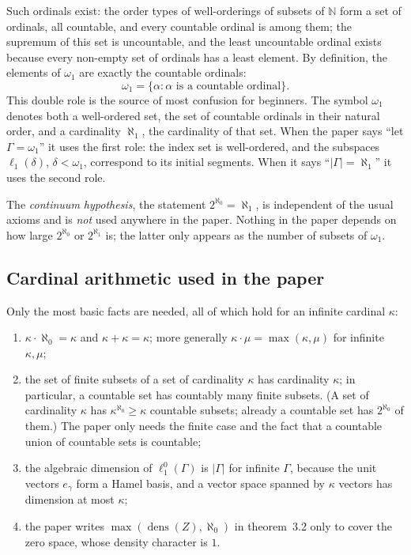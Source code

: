 \documentclass[12pt]{article}
\theoremstyle{definition}
\theoremstyle{remark}
\newcommand{\lo}[1]{\ell_1^0(#1)}
\newcommand{\ellone}[1]{\ell_1(#1)}
\newcommand{\NN}{\mathbb{N}}
\begin{document}
Such ordinals exist: the order types of well-orderings of subsets of $\NN$
form a set of ordinals, all countable, and every countable ordinal is among
them; the supremum of this set is uncountable, and the least
uncountable ordinal exists because every non-empty set of ordinals has a least element.
By definition, the elements of $\omega_1$ are exactly the countable ordinals:
\[
\omega_1=\{\alpha:\alpha\text{ is a countable ordinal}\}.
\]
This double role is the source of most confusion for beginners. The symbol
$\omega_1$ denotes both a well-ordered set, the set of countable ordinals in
their natural order, and a cardinality $\aleph_1$, the cardinality of that
set. When the paper says ``let $\Gamma=\omega_1$'' it uses the first role: the
index set is well-ordered, and the subspaces $\ellone{\delta}$,
$\delta<\omega_1$, correspond to its initial segments. When it says
``$|\Gamma|=\aleph_1$'' it uses the second role.

The \emph{continuum hypothesis}, the statement $2^{\aleph_0}=\aleph_1$, is
independent of the usual axioms and is \emph{not} used anywhere in the paper.
Nothing in the paper depends on how large $2^{\aleph_0}$ or $2^{\aleph_1}$
is; the latter only appears as the number of subsets of $\omega_1$.

\subsection{Cardinal arithmetic used in the paper}

Only the most basic facts are needed, all of which hold for an infinite
cardinal $\kappa$:
\begin{enumerate}[label = (\alph*)]
    \item $\kappa\cdot\aleph_0=\kappa$ and $\kappa+\kappa=\kappa$; more
          generally $\kappa\cdot\mu=\max(\kappa,\mu)$ for infinite $\kappa,\mu$;
    \item the set of finite subsets of a set of cardinality $\kappa$ has
          cardinality $\kappa$; in particular, a countable set has countably
          many finite subsets. (A set of cardinality $\kappa$ has
          $\kappa^{\aleph_0}\geq\kappa$ countable subsets; already a
          countable set has $2^{\aleph_0}$ of them.) The paper only needs the
          finite case and the fact that a countable union of countable sets
          is countable;
    \item the algebraic dimension of $\lo{\Gamma}$ is $|\Gamma|$ for infinite
          $\Gamma$, because the unit vectors $e_\gamma$ form a Hamel basis,
          and a vector space spanned by $\kappa$ vectors has dimension at most
          $\kappa$;
    \item the paper writes $\max(\operatorname{dens}(Z),\aleph_0)$ in
          theorem~3.2 only to cover the zero space, whose density
          character is $1$.
\end{enumerate}
\end{document}
